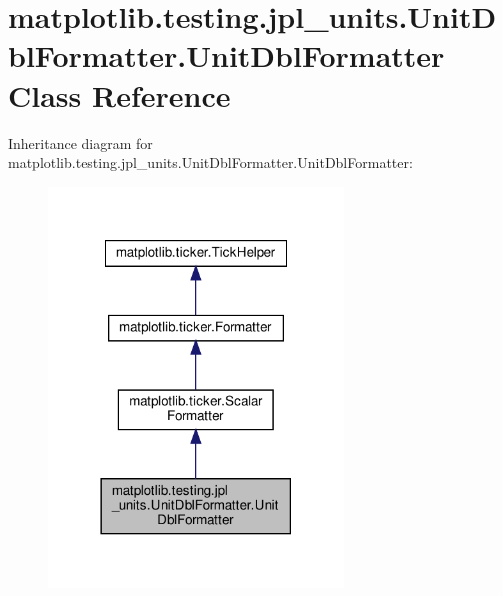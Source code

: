\hypertarget{classmatplotlib_1_1testing_1_1jpl__units_1_1UnitDblFormatter_1_1UnitDblFormatter}{}\section{matplotlib.\+testing.\+jpl\+\_\+units.\+Unit\+Dbl\+Formatter.\+Unit\+Dbl\+Formatter Class Reference}
\label{classmatplotlib_1_1testing_1_1jpl__units_1_1UnitDblFormatter_1_1UnitDblFormatter}


Inheritance diagram for matplotlib.\+testing.\+jpl\+\_\+units.\+Unit\+Dbl\+Formatter.\+Unit\+Dbl\+Formatter\+:
\nopagebreak
\begin{figure}[H]
\begin{center}
\leavevmode
\includegraphics[width=222pt]{classmatplotlib_1_1testing_1_1jpl__units_1_1UnitDblFormatter_1_1UnitDblFormatter__inherit__graph}
\end{center}
\end{figure}


